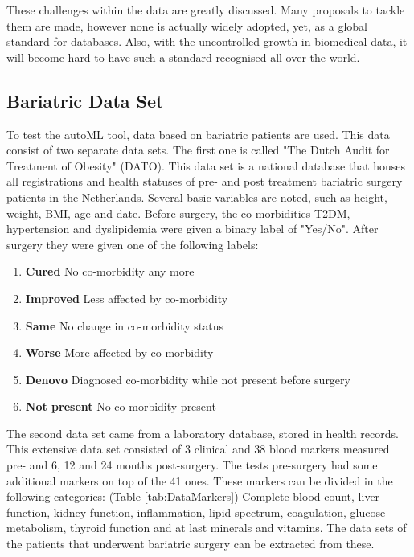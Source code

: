 \documentclass[10pt,a4paper]{article}
\begin{document}
	These challenges within the data are greatly discussed.\cite{bellazzi2011data} Many proposals to tackle them are made, however none is actually widely adopted, yet, as a global standard for databases. Also, with the uncontrolled growth in biomedical data, it will become hard to have such a standard recognised all over the world. \cite{Otasek2014, marenco2004qis, bichutskiy2006heterogeneous, sperzel1991biomedical, aubry1988design, Windridge2014}  
	
	
	\subsection{Bariatric Data Set}
	\label{subsec:BariatricDataSet}
	
	To test the autoML tool, data based on bariatric patients are used. This data consist of two separate data sets. The first one is called "The Dutch Audit for Treatment of Obesity" (DATO). This data set is a national database that houses all registrations and health statuses of pre- and post treatment bariatric surgery patients in the Netherlands. Several basic variables are noted, such as height, weight, BMI, age and date. Before surgery, the co-morbidities T2DM, hypertension and dyslipidemia were given a binary label of "Yes/No". After surgery they were given one of the following labels:

	\begin{enumerate}
	\item \textbf{Cured} No co-morbidity any more		
	\item \textbf{Improved} Less affected by co-morbidity
	\item \textbf{Same} No change in co-morbidity status
	\item \textbf{Worse} More affected by co-morbidity
	\item \textbf{Denovo} Diagnosed co-morbidity while not present before surgery
	\item \textbf{Not present} No co-morbidity present				
	\end{enumerate}

	The second data set came from a laboratory database, stored in health records. This extensive data set consisted of 3 clinical and 38 blood markers measured pre- and 6, 12 and 24 months post-surgery. The tests pre-surgery had some additional markers on top of the 41 ones. These markers can be divided in the following categories: (Table \ref{tab:DataMarkers}) Complete blood count, liver function, kidney function, inflammation, lipid spectrum, coagulation, glucose metabolism, thyroid function and at last minerals and vitamins. The data sets of the patients that underwent bariatric surgery can be extracted from these. 
\end{document}

